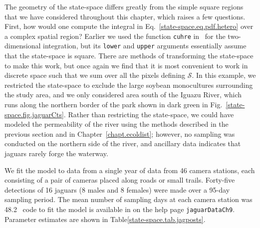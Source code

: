 The geometry of the state-space differs greatly from the simple square
regions that we have considered throughout this chapter, which raises
a few questions. First, how would one compute the integral in
Eq.~\ref{state-space.eq.pdf.hetero} over a
complex spatial region? Earlier we used the function \verb+cuhre+ in
\R~for the two-dimensional integration, but its \verb+lower+ and
\verb+upper+ arguments essentially assume that the state-space is
square. There are methods of transforming the state-space to make this
work, but once again we find that it is most convenient to work in
discrete space such that we sum over all the pixels defining
$\mathcal{S}$. In this example, we restricted the state-space to exclude the large
soybean monocultures surrounding the study area, and we only
considered area south of the Iguazu River, which runs along the northern border
of the park shown in dark green in
Fig.~\ref{state-space.fig.jaguarCts}. Rather than restricting the
state-space, we could have modeled the permeability of the river using
the methods described in the previous section and in
Chapter~\ref{chapt.ecoldist}; however, no sampling was conducted on
the northern side of the river, and ancillary data indicates that
jaguars rarely forge the waterway.

We fit the model to data from a single year of data from 46
camera stations, each consisting of a pair of cameras placed along
roads or small trails. Forty-five detections of 16 jaguars (8 males and 8
females) were made over a 95-day sampling period. The mean number of
sampling days at each camera station was 48.2 \R~code to fit the model is
available in \scrbook  on the help page \verb+jaguarDataCh9+.
Parameter estimates are shown in Table\ref{state-space.tab.jagposts}.




